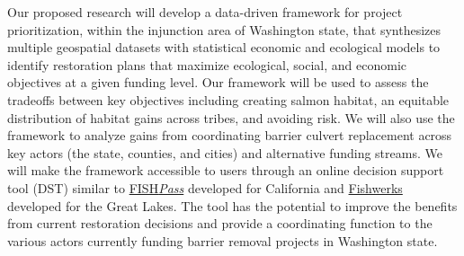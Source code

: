 \documentclass[12pt]{elsarticle}
\begin{document}
Our proposed research will develop a data-driven framework for project prioritization, within the injunction area of Washington state, that synthesizes multiple geospatial datasets with statistical economic and ecological models to identify restoration plans that maximize ecological, social, and economic objectives at a given funding level. Our framework will be used to assess the tradeoffs between key objectives including creating salmon habitat, an equitable distribution of habitat gains across tribes, and avoiding risk. We will also use the framework to analyze gains from coordinating barrier culvert replacement across key actors (the state, counties, and cities) and alternative funding streams. We will make the framework accessible to users through an online decision support tool (DST) similar to \href{https://fishpass.psmfc.org}{FISH\emph{Pass}} developed for California and \href{https://greatlakesconnectivity.org}{Fishwerks} developed for the Great Lakes. The tool has the potential to improve the benefits from current restoration decisions and provide a coordinating function to the various actors currently funding barrier removal projects in Washington state. 


\end{document}
